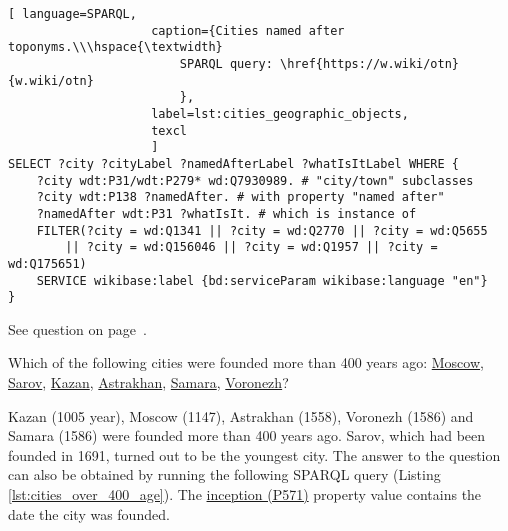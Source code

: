 \begin{lstlisting}[ language=SPARQL, 
                    caption={Cities named after toponyms.\\\hspace{\textwidth}
                        SPARQL query: \href{https://w.wiki/otn}{w.wiki/otn}
                        },
                    label=lst:cities_geographic_objects,
                    texcl 
                    ]
SELECT ?city ?cityLabel ?namedAfterLabel ?whatIsItLabel WHERE {
	?city wdt:P31/wdt:P279* wd:Q7930989. # "city/town" subclasses
	?city wdt:P138 ?namedAfter. # with property "named after"
	?namedAfter wdt:P31 ?whatIsIt. # which is instance of
	FILTER(?city = wd:Q1341 || ?city = wd:Q2770 || ?city = wd:Q5655 
		|| ?city = wd:Q156046 || ?city = wd:Q1957 || ?city = wd:Q175651)
	SERVICE wikibase:label {bd:serviceParam wikibase:language "en"}
}
\end{lstlisting}%

See question on page~\pageref{question:cities_geographic_objects}.


\begin{exercise}%
    \label{answer:cities_over_400_age}
Which of the following cities were founded more than 400 years ago: \href{https://w.wiki/pzt}{Moscow}, \href{https://w.wiki/pzu}{Sarov}, \href{https://w.wiki/pzx}{Kazan}, \href{https://w.wiki/pzy}{Astrakhan}, \href{https://w.wiki/pzz}{Samara}, \href{https://w.wiki/pz$}{Voronezh}?
\end{exercise}

Kazan (1005 year), Moscow (1147), Astrakhan (1558), Voronezh (1586) and Samara (1586) were founded more than 400 years ago. Sarov, which had been founded in 1691, turned out to be the youngest city. The answer to the question can also be obtained by running the following SPARQL query (Listing \ref{lst:cities_over_400_age}). The \href{https://www.wikidata.org/wiki/Property:P571}{inception (P571)} property value contains the date the city was founded.

